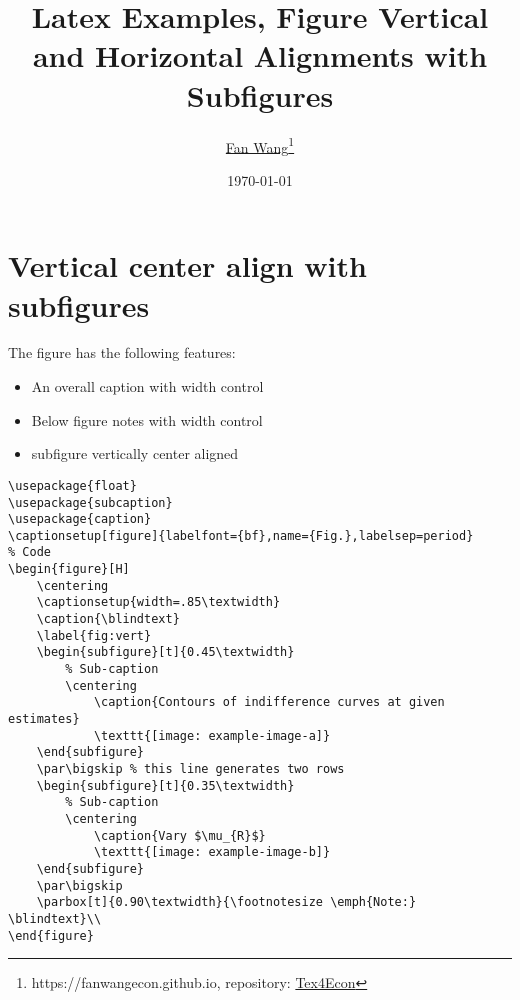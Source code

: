 \documentclass[12pt,english]{article}
\title{Latex Examples, Figure Vertical and Horizontal Alignments with Subfigures}
\author{\href{https://fanwangecon.github.io/}{Fan Wang}\thanks{https://fanwangecon.github.io, repository: \href{https://fanwangecon.github.io/Tex4Econ/}{Tex4Econ}}}
\date{\today}
\begin{document}
\maketitle
\tableofcontents
\clearpage 

\section{Vertical center align with subfigures}

The figure has the following features:
\begin{itemize}
    \item An overall caption with width control
    \item Below figure notes with width control
    \item subfigure vertically center aligned
\end{itemize}

\begin{lstlisting}[frame=single]
% Included Package
\usepackage{float}
\usepackage{subcaption}
\usepackage{caption}
\captionsetup[figure]{labelfont={bf},name={Fig.},labelsep=period}
% Code
\begin{figure}[H]
    \centering
    \captionsetup{width=.85\textwidth}
	\caption{\blindtext}
	\label{fig:vert}
	\begin{subfigure}[t]{0.45\textwidth}
        % Sub-caption
        \centering
    		\caption{Contours of indifference curves at given estimates}
    		\texttt{[image: example-image-a]}
	\end{subfigure}
	\par\bigskip % this line generates two rows
	\begin{subfigure}[t]{0.35\textwidth}
	    % Sub-caption
	    \centering
    		\caption{Vary $\mu_{R}$}
    		\texttt{[image: example-image-b]}
	\end{subfigure}
	\par\bigskip
    \parbox[t]{0.90\textwidth}{\footnotesize \emph{Note:} \blindtext}\\
\end{figure}
\end{lstlisting}
\end{document}

